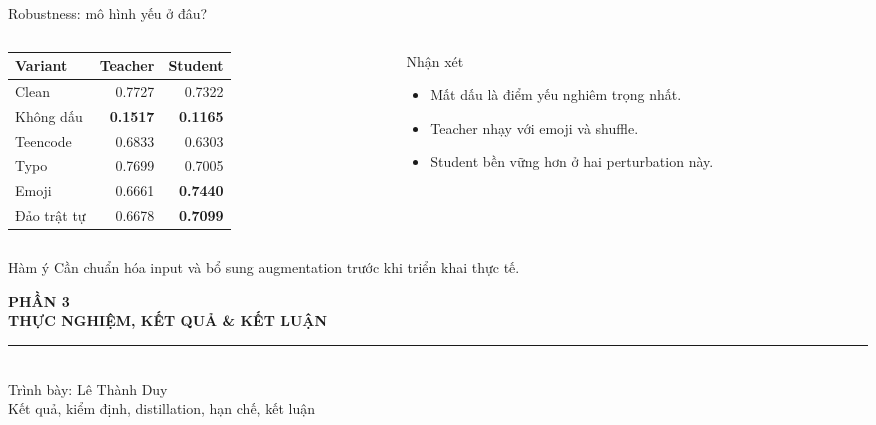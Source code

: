 \documentclass[aspectratio=169,11pt]{beamer}
\newcommand{\good}[1]{\textcolor{sgublue}{\textbf{#1}}}
\newcommand{\bad}[1]{\textcolor{red!70!black}{\textbf{#1}}}
\begin{document}
\begin{frame}{Robustness: mô hình yếu ở đâu?}
\small
\begin{columns}[T]
\begin{column}{0.52\textwidth}
\begin{tabular}{@{}lrr@{}}
\toprule
Variant & Teacher & Student \\
\midrule
Clean & 0.7727 & 0.7322 \\
Không dấu & \bad{0.1517} & \bad{0.1165} \\
Teencode & 0.6833 & 0.6303 \\
Typo & 0.7699 & 0.7005 \\
Emoji & 0.6661 & \good{0.7440} \\
Đảo trật tự & 0.6678 & \good{0.7099} \\
\bottomrule
\end{tabular}
\end{column}
\begin{column}{0.45\textwidth}
\begin{block}{Nhận xét}
\begin{itemize}
  \item Mất dấu là điểm yếu nghiêm trọng nhất.
  \item Teacher nhạy với emoji và shuffle.
  \item Student bền vững hơn ở hai perturbation này.
\end{itemize}
\end{block}
\end{column}
\end{columns}

\vspace{0.15cm}
\begin{alertblock}{Hàm ý}
Cần chuẩn hóa input và bổ sung augmentation trước khi triển khai thực tế.
\end{alertblock}
\end{frame}

\begin{frame}[plain]
\begin{center}
\vspace*{0.9cm}
{\small\bfseries\color{sgublue} PHẦN 3}\\[0.25cm]
{\LARGE\bfseries\color{sgublue} THỰC NGHIỆM, KẾT QUẢ \& KẾT LUẬN}\\[0.2cm]
{\color{sgublue}\rule{0.55\textwidth}{0.8pt}}\\[0.2cm]
{\large Trình bày: Lê Thành Duy}\\[0.2cm]
{\small Kết quả, kiểm định, distillation, hạn chế, kết luận}\\[0.15cm]
\end{center}
\end{frame}
\end{document}
